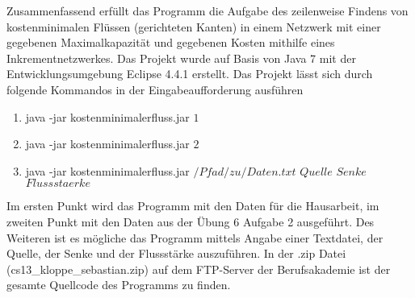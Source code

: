 Zusammenfassend erfüllt das Programm die Aufgabe des zeilenweise Findens von
kostenminimalen Flüssen (gerichteten Kanten) in einem Netzwerk mit einer gegebenen 
Maximalkapazität und gegebenen Kosten mithilfe eines Inkrementnetzwerkes. Das Projekt 
wurde auf Basis von Java 7 mit der Entwicklungsumgebung Eclipse 4.4.1 erstellt. Das 
Projekt lässt sich durch folgende Kommandos in der Eingabeaufforderung ausführen
\begin{enumerate}
\item java -jar kostenminimalerfluss.jar $1$
\item java -jar kostenminimalerfluss.jar $2$ 
\item java -jar kostenminimalerfluss.jar $/Pfad/zu/Daten.txt$ $Quelle$ $Senke$ 
$Flussstaerke$ 
\end{enumerate}
Im ersten Punkt wird das Programm mit den Daten für die Hausarbeit, im zweiten Punkt
mit den Daten aus der Übung 6 Aufgabe 2 ausgeführt. Des Weiteren ist es mögliche das
Programm mittels Angabe einer Textdatei, der Quelle, der Senke und der Flussstärke 
auszuführen. In der .zip Datei (cs13\_kloppe\_sebastian.zip) auf dem FTP-Server der 
Berufsakademie ist der gesamte Quellcode des Programms zu finden.